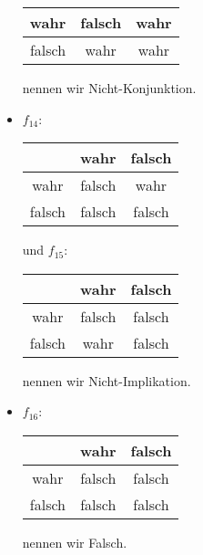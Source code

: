 \begin{solution}
\begin{itemize}
\begin{tabular}{|c||c|c|}
 \hline
 \hline
 wahr & falsch & wahr \\
 \hline
 falsch & wahr & wahr\\
 \hline
 \end{tabular} nennen wir Nicht-Konjunktion.
 \item
 $f_{14}$:\quad\begin{tabular}{|c||c|c|}
 \hline
 & wahr & falsch \\
 \hline
 \hline
 wahr & falsch & wahr \\
 \hline
 falsch & falsch & falsch\\
 \hline
 \end{tabular} und
 $f_{15}$:\quad\begin{tabular}{|c||c|c|}
 \hline
 & wahr & falsch \\
 \hline
 \hline
 wahr & falsch & falsch \\
 \hline
 falsch & wahr & falsch\\
 \hline
 \end{tabular} nennen wir Nicht-Implikation.
  \item
  $f_{16}$:\quad\begin{tabular}{|c||c|c|}
  \hline
  & wahr & falsch \\
  \hline
  \hline
  wahr & falsch & falsch \\
  \hline
  falsch & falsch & falsch\\
  \hline
  \end{tabular} nennen wir Falsch.
\end{itemize}

\end{solution}

